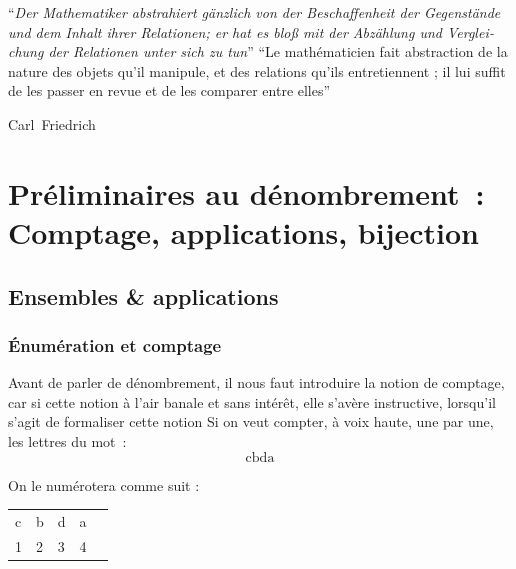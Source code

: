 \documentclass[a4paper,french,final]{memoir}
\begin{document}
\epigraph{\foreignlanguage{german}{\enquote{\itshape Der Mathematiker abstrahiert gänzlich von der Beschaffenheit der Gegenstände und dem Inhalt ihrer Relationen; er hat es bloß mit der Abzählung und Vergleichung der Relationen unter sich zu tun}}\newline\newline
\enquote{Le mathématicien fait abstraction de la nature des objets qu'il manipule, et des relations qu'ils entretiennent ; il lui suffit de les passer en revue et de les comparer entre elles}
}{Carl~Friedrich~~\cite{gauss_cite}}
\mainmatter
\part{Préliminaires au dénombrement~: Comptage, applications, bijection}
\chapter{Ensembles \& applications}
\section{\'Enumération et comptage}
Avant de parler de dénombrement, il nous faut introduire la notion de comptage, car si cette notion à l'air banale et sans intérêt, elle s'avère instructive, lorsqu'il s'agit de formaliser cette notion
Si on veut compter, à voix haute, une par une, les lettres du mot~:\[\text{cbda}\]

On le numérotera comme suit :
\begin{table}[h]
\centering
\begin{tabular}{lllll}
c & b & d & a &  \\
1 & 2 & 3 & 4 &
\end{tabular}
\end{table}
\end{document}
